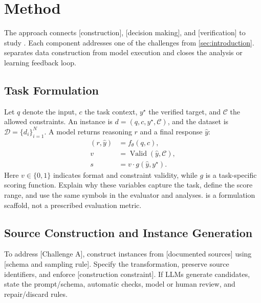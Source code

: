 \section{Method}
\label{sec:method}

The approach connects [construction], [decision making], and [verification] to study \CoreTerm{}. Each component addresses one of the challenges from \cref{sec:introduction}.  separates data construction from model execution and closes the analysis or learning feedback loop.

\begin{widefigure}[htbp]
\centering

\caption{\textbf{End-to-end pipeline scaffold.} Source records become validated instances, then pass through inference or training and evaluation. Feedback returns to repair or learning; replace these labels and edges with the real scientific design.}
\label{fig:pipeline}
\end{widefigure}

\subsection{Task Formulation}
Let $q$ denote the input, $c$ the task context, $y^\star$ the verified target, and $\mathcal{C}$ the allowed constraints. An instance is $d=(q,c,y^\star,\mathcal{C})$, and the dataset is $\mathcal{D}=\{d_i\}_{i=1}^{N}$. A model returns reasoning $r$ and a final response $\hat y$:
\begin{equation}
\begin{aligned}
(r,\hat y) &= f_\theta(q,c),\\
v &= \operatorname{Valid}(\hat y,\mathcal{C}),\\
s &= v\cdot g(\hat y,y^\star).
\end{aligned}
\label{eq:formulation}
\end{equation}
Here $v\in\{0,1\}$ indicates format and constraint validity, while $g$ is a task-specific scoring function. Explain why these variables capture the task, define the score range, and use the same symbols in the evaluator and analyses.  is a formulation scaffold, not a prescribed evaluation metric.

\subsection{Source Construction and Instance Generation}
To address [Challenge A], construct instances from [documented sources] using [schema and sampling rule]. Specify the transformation, preserve source identifiers, and enforce [construction constraint]. If LLMs generate candidates, state the prompt/schema, automatic checks, model or human review, and repair/discard rules.

